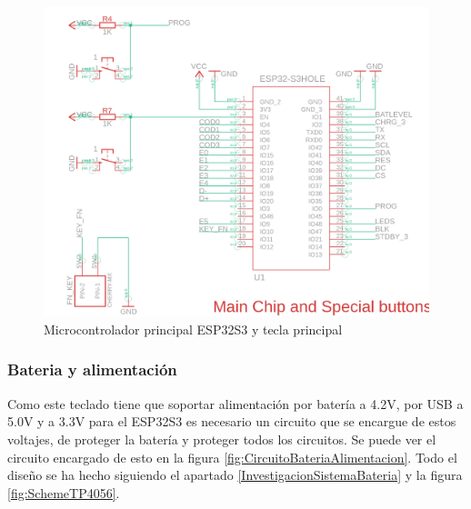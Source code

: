 \begin{figure}[H]
    \centering
    \includegraphics[width=1.0\textwidth]{imagenes/Capitulos/Cap04/CHIP.png}
    \caption{Microcontrolador principal ESP32S3 y tecla principal}
    \label{fig:ESP32S3Circuito}
\end{figure}

\newpage
\subsubsection{Bateria y alimentación}
Como este teclado tiene que soportar alimentación por batería a 4.2V, por \gls{USB} a 5.0V y a 3.3V para el ESP32S3 es necesario un circuito que se encargue de estos voltajes, de proteger la batería y proteger todos los circuitos. Se puede ver el circuito encargado de esto en la figura \ref{fig:CircuitoBateriaAlimentacion}. Todo el diseño se ha hecho siguiendo el apartado \ref{InvestigacionSistemaBateria} y la figura \ref{fig:SchemeTP4056}.

